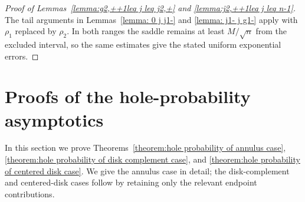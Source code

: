 \documentclass[a4paper]{article}
\numberwithin{equation}{section}
\begin{document}
\begin{proof}[Proof of Lemmas~\ref{lemma:g2,++1leq j leq j2,+} and
\ref{lemma:j2,++1leq j leq n-1}]
The tail arguments in Lemmas~\ref{lemma: 0 j j1-} and
\ref{lemma: j1- j g1-} apply with $\rho_1$ replaced by $\rho_2$.  In both
ranges the saddle remains at least $M/\sqrt n$ from the excluded interval,
so the same estimates give the stated uniform exponential errors.
\end{proof}




\section{Proofs of the hole-probability asymptotics}
\label{section:hole-proofs}
\label{section:proof of hole probability part}
In this section we prove Theorems~\ref{theorem:hole probability of annulus case}, \ref{theorem:hole probability of disk complement case}, and \ref{theorem:hole probability of centered disk case}. We give the annulus case in detail; the disk-complement and centered-disk cases follow by retaining only the relevant endpoint contributions.
\end{document}
